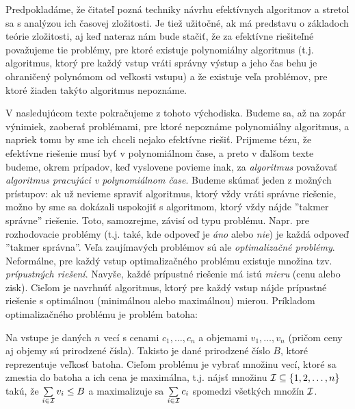 Predpokladáme, že čitateľ pozná techniky návrhu efektívnych algoritmov a
stretol sa s analýzou ich časovej zložitosti. Je tiež užitočné, ak má predstavu
o základoch teórie zložitosti, aj keď nateraz nám bude stačiť, že za efektívne
riešiteľné považujeme tie problémy, pre ktoré existuje polynomiálny algoritmus
(t.j. algoritmus, ktorý pre každý vstup vráti správny výstup a jeho čas behu je
ohraničený polynómom od veľkosti vstupu) a že existuje veľa problémov, pre
ktoré žiaden takýto algoritmus nepoznáme. 

V nasledujúcom texte pokračujeme z tohoto východiska. Budeme sa, až na zopár
výnimiek, zaoberať problémami, pre ktoré nepoznáme polynomiálny algoritmus, a
napriek tomu by sme ich chceli nejako efektívne riešiť. Prijmeme tézu, že 
efektívne riešenie musí byť v polynomiálnom čase, a preto v ďalšom texte budeme,
okrem prípadov, keď vyslovene povieme inak, za {\em algoritmus} považovať
{\em algoritmus pracujúci v polynomiálnom čase}.
Budeme skúmať jeden z možných
prístupov: ak už nevieme spraviť algoritmus, ktorý vždy vráti
správne riešenie, možno by sme sa dokázali uspokojiť s 
algoritmom, ktorý vždy nájde ''takmer správne'' riešenie. Toto,
samozrejme, závisí od typu problému.  Napr. pre rozhodovacie problémy (t.j.
také, kde odpoveď je {\em áno} alebo {\em nie}) je každá odpoveď ''takmer
správna''. Veľa zaujímavých problémov sú ale {\em optimalizačné problémy}.
Neformálne, pre každý vstup optimalizačného problému existuje množina tzv. {\em
prípustných riešení}. Navyše, každé prípustné riešenie má istú {\em mieru}
(cenu alebo zisk). Cieľom je navrhnúť algoritmus, ktorý pre každý vstup nájde
prípustné riešenie s optimálnou (minimálnou alebo maximálnou) mierou.
Príkladom optimalizačného problému je problém batoha:

\shorthandoff{-}  
  \begin{framed}
  \begin{dfn}
    \label{dfn:knapsack}
    Na vstupe je daných $n$ vecí s cenami $c_1,\ldots,c_n$ a objemami
    $v_1,\ldots,v_n$ (pričom ceny aj objemy sú prirodzené čísla).  Takisto
    je dané prirodzené číslo $B$, ktoré reprezentuje veľkosť batoha. Cieľom
    problému \knapsack je vybrať množinu vecí, ktoré sa zmestia do batoha a ich
    cena je maximálna, t.j. nájsť množinu ${\cal I}\subseteq\{1,2,\ldots,n\}$
    takú, že $\sum\limits_{i\in{\cal I}}v_i\le B$  a maximalizuje sa
    $\sum\limits_{i\in{\cal I}}c_i$ spomedzi všetkých množín $\cal I$.
  \end{dfn}
\end{framed}

